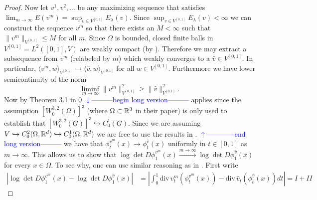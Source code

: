 \documentclass[noinfoline]{imsart}
\def\Ver{1}
\def\LongVer{0}
\begin{document}
\begin{proof}
Now let $v^1,v^2,\ldots$ be any maximizing sequence that satisfies $\lim_{m\rightarrow \infty} E(v^m) = \sup_{v\in V^{[0,1]}}E_\lambda(v)$. Since $\sup_{v\in V^{[0,1]}}E_\lambda(v)<\infty $  we can construct the sequence $v^m$ so that there exists an $M<\infty$ such that $\| v^m \|_{V^{[0,1]}}\leq M$ for all $m$. Since $\Omega$ is bounded, closed finite balls in $V^{[0,1]}=L^2([0,1],V)$ are weakly compact (by \cite{dup:98}). Therefore we may  extract a subsequence from $v^m$ (relabeled by $m$) which weakly converges to  a $\hat v \in V^{[0,1]}$. In particular, $\langle v^m, w \rangle_{V^{[0,1]}}\rightarrow \langle \hat v, w \rangle_{V^{[0,1]}}$ for all $w\in V^{[0,1]}$. Furthermore we have lower semicontinuity of the norm
\begin{equation}
\label{liminf}
 \liminf_{m\rightarrow \infty} \| v^m \|^2_{V^{[0,1]}} \geq  \| \hat v \|^2_{V^{[0,1]}}.
\end{equation}
Now by Theorem 3.1 in \cite{dup:98}
\if\Ver\LongVer{
{\flushleft\textcolor{blue}{$\downarrow$---------begin long version---------}}\newline
\cite{dup:98}  applies since the assumption $[W_0^{3,2}(\Omega)]^3$ (where $\Omega\subset \Bbb R^3$ in their paper) is only used to establish that $[W_0^{3,2}(G)]^3\hookrightarrow C_0^1(G)$. Since we are assuming $V\hookrightarrow C_0^2(\Omega, \Bbb R^d)\hookrightarrow C_0^1(\Omega, \Bbb R^d)$ we are free to use the results in \cite{dup:98} .
{\flushleft\textcolor{blue}{$\uparrow$------------end long version---------}}\newline
} \fi
 we have that  $\phi^{v^m}_t(x) \rightarrow \phi^{\hat v}_t(x)$ uniformly in $t\in [0,1]$ as $m\rightarrow \infty$.
This allows us to show that $\log \det D\phi_1^{v^m}(x)\overset{m\rightarrow\infty}\longrightarrow \log \det D\phi_1^{\hat v}(x)$ for every $x\in \Omega$. To see why, one can use similar reasoning as in \cite{cao:05}. First write
\begin{align*}
|\log \det D\phi_1^{v^m}(x)- \log \det D\phi_1^{\hat v}(x)| &= \left| \int_{0}^1 \text{div}\, v_t^m(\phi_t^{v^m}(x)) -  \text{div}\, \hat v_t(\phi_t^{\hat v}(x)) dt \right|
=I + I\!I

\end{align*}
\end{proof}
\end{document}
